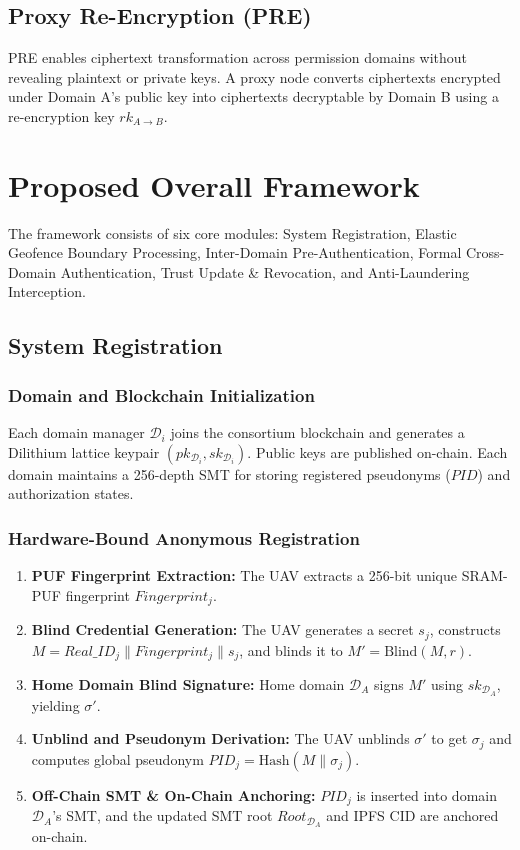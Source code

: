 \documentclass[lettersize,journal]{IEEEtran}
\begin{document}
\subsection{Proxy Re-Encryption (PRE)}
PRE enables ciphertext transformation across permission domains without revealing plaintext or private keys. A proxy node converts ciphertexts encrypted under Domain A's public key into ciphertexts decryptable by Domain B using a re-encryption key $rk_{A \to B}$.
\section{Proposed Overall Framework}
The framework consists of six core modules: System Registration, Elastic Geofence Boundary Processing, Inter-Domain Pre-Authentication, Formal Cross-Domain Authentication, Trust Update \& Revocation, and Anti-Laundering Interception.
\subsection{System Registration}
\subsubsection{Domain and Blockchain Initialization}
Each domain manager $\mathcal{D}_i$ joins the consortium blockchain and generates a Dilithium lattice keypair $(pk_{\mathcal{D}_i}, sk_{\mathcal{D}_i})$. Public keys are published on-chain. Each domain maintains a 256-depth SMT for storing registered pseudonyms ($PID$) and authorization states.
\subsubsection{Hardware-Bound Anonymous Registration}
\begin{enumerate}
    \item \textbf{PUF Fingerprint Extraction:} The UAV extracts a 256-bit unique SRAM-PUF fingerprint $Fingerprint_j$.
    \item \textbf{Blind Credential Generation:} The UAV generates a secret $s_j$, constructs $M = Real\_ID_j \parallel Fingerprint_j \parallel s_j$, and blinds it to $M' = \text{Blind}(M, r)$.
    \item \textbf{Home Domain Blind Signature:} Home domain $\mathcal{D}_A$ signs $M'$ using $sk_{\mathcal{D}_A}$, yielding $\sigma'$.
    \item \textbf{Unblind and Pseudonym Derivation:} The UAV unblinds $\sigma'$ to get $\sigma_j$ and computes global pseudonym $PID_j = \text{Hash}(M \parallel \sigma_j)$.
    \item \textbf{Off-Chain SMT \& On-Chain Anchoring:} $PID_j$ is inserted into domain $\mathcal{D}_A$'s SMT, and the updated SMT root $Root_{\mathcal{D}_A}$ and IPFS CID are anchored on-chain.
\end{enumerate}
\end{document}
